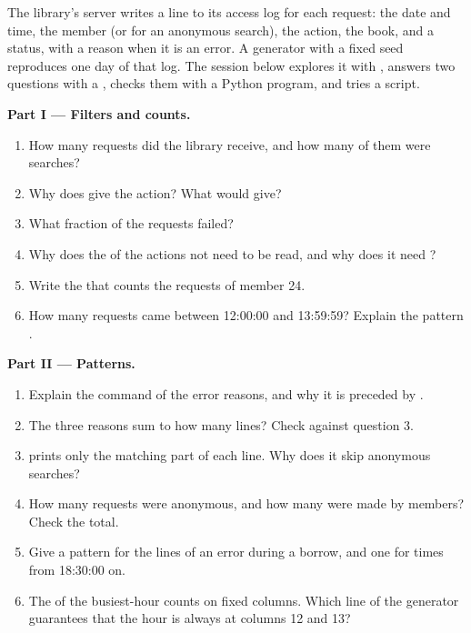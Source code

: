 \begin{problem}\label{pb:b1:the-shell:1}
The library's server writes a line to its access log for each request: the date and time, the member (or \code{-}
for an anonymous search), the action, the book, and a status, with a reason when it is an error. A generator with a
fixed seed reproduces one day of that log. The session below explores it with , answers two questions with a
, checks them with a Python program, and tries a script.
\label{lst:b1:the-shell:make-log}
\label{lst:b1:the-shell:logstat}
\label{lst:b1:the-shell:log-check}
\label{out:b1:the-shell:problem}

\medskip\noindent\textbf{Part I --- Filters and counts.}
\begin{enumerate}
\item How many requests did the library receive, and how many of them were searches?
\item Why does  give the action? What would  give?
\item What fraction of the requests failed?
\item Why does the  of the actions not need  to be read, and why does it need ?
\item Write the  that counts the requests of member 24.
\item How many requests came between 12:00:00 and 13:59:59? Explain the pattern .
\end{enumerate}

\medskip\noindent\textbf{Part II --- Patterns.}
\begin{enumerate}[resume]
\item Explain the  command of the error reasons, and why it is preceded by .
\item The three reasons sum to how many lines? Check against question 3.
\item {} prints only the matching part of each line. Why does it skip anonymous searches?
\item How many requests were anonymous, and how many were made by members? Check the total.
\item Give a  pattern for the lines of an error during a borrow, and one for times from 18:30:00 on.
\item The  of the busiest-hour  counts on fixed columns. Which line of the generator guarantees
that the hour is always at columns 12 and 13?
\end{enumerate}


\end{problem}
